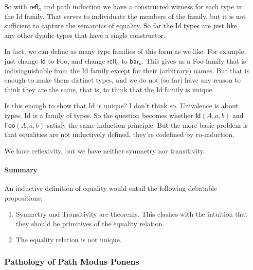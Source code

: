 So with \(\textsf{refl}_a\) and path induction we have a constructed
witness for each type in the \textsf{Id} family. That serves to
individuate the members of the family, but it is not sufficient to
capture the semantics of equality. So far the \textsf{Id} types are
just like any other dyadic types that have a single constructor.

In fact, we can define as many type families of this form as we like.
For example, just change \(\textsf{Id}\) to \textsf{Foo}, and change
\(\textsf{refl}_a\) to \(\textsf{bar}_a\). This gives us a
\textsf{Foo} family that is indisinguishable from the \textsf{Id}
family except for their (arbitrary) names. But that is enough to make
them distinct types, and we do not (so far) have any reason to think
they are the same, that is, to think that the \textsf{Id} family is
unique.


Is this enough to show that \textsf{Id} is unique? I don't think so.
Univalence is about types, \textsf{Id} is a family of types. So the
question becomes whether \(\textsf{Id}(A,a,b)\) and
\(\textsf{Foo}(A,a,b)\) satisfy the same induction principle. But the
more basic problem is that equalities are not inductively defined,
they're codefined by co-induction.

 We have reflexivity, but we have
neither symmetry nor transitivity.

\paragraph{Summary}
An inductive definition of equality would entail the following
debatable propositions:


\begin{enumerate}
\item Symmetry and Transitivity are theorems. This clashes with the
  intuition that they should be primitives of the equality relation.
\item The equality relation is not unique.
\end{enumerate}

\subsubsection{Pathology of Path Modus Ponens}


